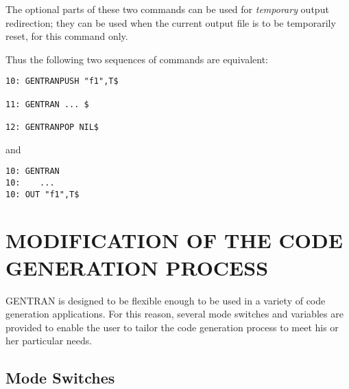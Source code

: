 The optional parts of these two commands can be used for {\it temporary}
output redirection; they can be used when the current output
file is to be temporarily reset, for this command only.

Thus the following two sequences of commands are equivalent:
\begin{verbatim}
10: GENTRANPUSH "f1",T$ 

11: GENTRAN ... $

12: GENTRANPOP NIL$
\end{verbatim}

and

\begin{verbatim}
10: GENTRAN 
10:    ...
10: OUT "f1",T$
\end{verbatim}

\chapter{MODIFICATION OF THE CODE GENERATION PROCESS}

GENTRAN is designed to be flexible enough to be used in a variety of
code generation applications.  For this reason, several mode
switches and variables are provided to enable the user to tailor the
code generation process to meet his or her particular needs.
\section{Mode Switches}

